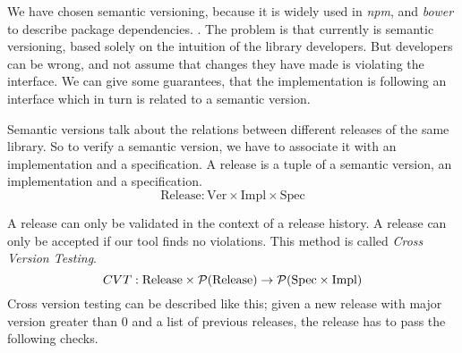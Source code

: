 We have chosen semantic versioning, because it is widely used in \emph{npm}, and
\emph{bower} to describe package dependencies. . The problem is that
currently is semantic versioning, based solely on the intuition of the library
developers.  But developers can be wrong, and not assume that changes they have
made is violating the interface. We can give some guarantees, that the
implementation is following an interface which in turn is related to a semantic
version. 

Semantic versions talk about the relations between different releases of the
same library. So to verify a semantic version, we have to associate it with an
implementation and a specification. A release is  a tuple of a semantic
version, an implementation and a specification.
$$ \text{Release} : \text{Ver} \times \text{Impl} \times \text{Spec} $$

A release can only be validated in the context of a release history. A
release can only be accepted if our tool finds no violations. This method is 
called \emph{Cross Version Testing}.
$$
CVT : \text{Release} \times \mathcal{P}(\text{Release}) \to \mathcal{P}(\text{Spec} \times \text{Impl})
$$
Cross version testing can be described like this; given a new release with
major version greater than 0 and a list of previous releases, the release has
to pass the following checks.

